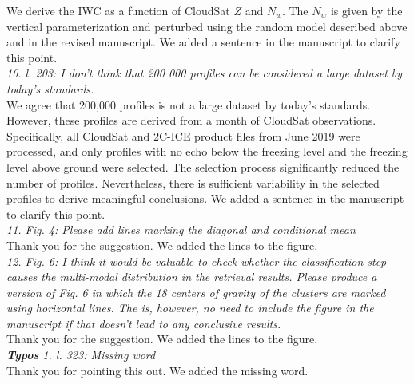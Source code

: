 \documentclass[12pt]{article}
\begin{document}
\newline
We derive the IWC as a function of CloudSat $Z$ and $N_w$.  The $N_w$ is given by the vertical parameterization and perturbed using the random model
described above and in the revised manuscript.  We added a sentence in the manuscript to clarify this point.\\
\newline
\textit{10. l. 203: I don't think that 200 000 profiles can be considered a large dataset by today's standards.}\\
\newline
We agree that 200,000 profiles is not a large dataset by today's standards.  However, these profiles are derived from a month of CloudSat observations.
Specifically, all CloudSat and 2C-ICE product files from June 2019 were processed, and only profiles with no echo below the freezing level
and the freezing level above ground were selected. The selection process significantly reduced the number of profiles. Nevertheless, there is sufficient
variability in the selected profiles to derive meaningful conclusions. We added a sentence in the manuscript to clarify this point.\\
\newline
\textit{11. Fig. 4: Please add lines marking the diagonal and conditional mean}\\
\newline
Thank you for the suggestion. We added the lines to the figure.\\
\newline   
\textit{12. Fig. 6: I think it would be valuable to check whether the classification step causes the multi-modal distribution 
    in the retrieval results. Please produce a version of Fig. 6 in which the 18 centers of gravity of the clusters 
    are marked using horizontal lines. The is, however, no need to include the figure in the manuscript if that doesn't lead
     to any conclusive results.}\\
\newline
Thank you for the suggestion.  We added the lines to the figure.\\
\newline  
\textit{\textbf{Typos}
    1. l. 323: Missing word}\\
\newline
Thank you for pointing this out.  We added the missing word.\\
\newline
\end{document}
